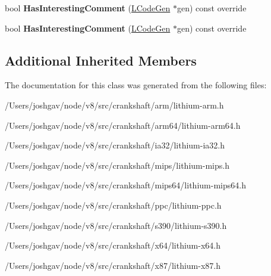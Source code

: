 \begin{DoxyCompactItemize}
\item 
bool {\bfseries Has\+Interesting\+Comment} (\hyperlink{classv8_1_1internal_1_1_l_code_gen}{L\+Code\+Gen} $\ast$gen) const  override\hypertarget{classv8_1_1internal_1_1_l_osr_entry_a2d7c8b5af2302b1d661967e5fd99a655}{}\label{classv8_1_1internal_1_1_l_osr_entry_a2d7c8b5af2302b1d661967e5fd99a655}

\item 
bool {\bfseries Has\+Interesting\+Comment} (\hyperlink{classv8_1_1internal_1_1_l_code_gen}{L\+Code\+Gen} $\ast$gen) const  override\hypertarget{classv8_1_1internal_1_1_l_osr_entry_a2d7c8b5af2302b1d661967e5fd99a655}{}\label{classv8_1_1internal_1_1_l_osr_entry_a2d7c8b5af2302b1d661967e5fd99a655}

\end{DoxyCompactItemize}
\subsection*{Additional Inherited Members}


The documentation for this class was generated from the following files\+:\begin{DoxyCompactItemize}
\item 
/\+Users/joshgav/node/v8/src/crankshaft/arm/lithium-\/arm.\+h\item 
/\+Users/joshgav/node/v8/src/crankshaft/arm64/lithium-\/arm64.\+h\item 
/\+Users/joshgav/node/v8/src/crankshaft/ia32/lithium-\/ia32.\+h\item 
/\+Users/joshgav/node/v8/src/crankshaft/mips/lithium-\/mips.\+h\item 
/\+Users/joshgav/node/v8/src/crankshaft/mips64/lithium-\/mips64.\+h\item 
/\+Users/joshgav/node/v8/src/crankshaft/ppc/lithium-\/ppc.\+h\item 
/\+Users/joshgav/node/v8/src/crankshaft/s390/lithium-\/s390.\+h\item 
/\+Users/joshgav/node/v8/src/crankshaft/x64/lithium-\/x64.\+h\item 
/\+Users/joshgav/node/v8/src/crankshaft/x87/lithium-\/x87.\+h\end{DoxyCompactItemize}

